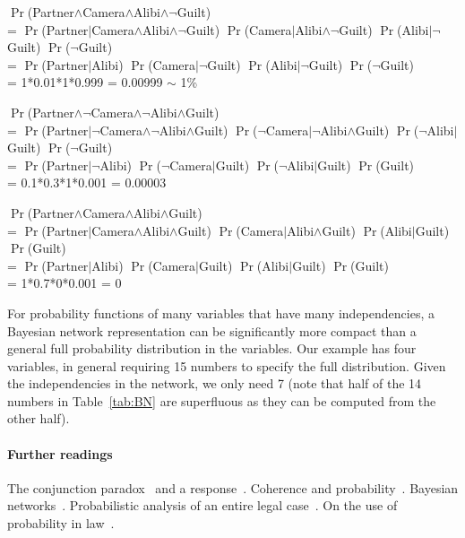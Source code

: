 \documentclass[10pt]{article}
\begin{document}
\begin{description}
	\item $\Pr$(Partner$ \land $Camera$ \land $Alibi$ \land \neg$Guilt)\\
	= $\Pr$(Partner$ | $Camera$ \land $Alibi$ \land \neg$Guilt) $\Pr$(Camera$ | $Alibi$ \land \neg$Guilt) $\Pr$(Alibi$ | \neg$Guilt) $\Pr$($\neg$Guilt)\\
	= $\Pr$(Partner$ | $Alibi) $\Pr$(Camera$ | \neg$Guilt) $\Pr$(Alibi$ | \neg$Guilt) $\Pr$($\neg$Guilt) \\
	= 1*0.01*1*0.999 = 0.00999 $\sim$ 1\%
\end{description}
\begin{description}
	\item $\Pr$(Partner$ \land \neg$Camera$ \land \neg$Alibi$ \land $Guilt)\\
	= $\Pr$(Partner$ | \neg$Camera$ \land \neg$Alibi$ \land $Guilt) $\Pr$($\neg$Camera$ | \neg$Alibi$ \land $Guilt) $\Pr$($\neg$Alibi$ | $Guilt) $\Pr$($\neg$Guilt)\\
	= $\Pr$(Partner$ | \neg$Alibi) $\Pr$($\neg$Camera$ | $Guilt) $\Pr$($\neg$Alibi$ | $Guilt) $\Pr$(Guilt) \\
	= 0.1*0.3*1*0.001 = 0.00003
\end{description}
\begin{description}
	\item $\Pr$(Partner$ \land $Camera$ \land $Alibi$ \land $Guilt)\\
	= $\Pr$(Partner$ | $Camera$ \land $Alibi$ \land $Guilt) $\Pr$(Camera$ | $Alibi$ \land $Guilt) $\Pr$(Alibi$ | $Guilt) $\Pr$(Guilt)\\
	= $\Pr$(Partner$ | $Alibi) $\Pr$(Camera$ | $Guilt) $\Pr$(Alibi$ | $Guilt) $\Pr$(Guilt) \\
	= 1*0.7*0*0.001 = 0
\end{description}

\noindent For probability functions of many variables that have many independencies, a Bayesian network representation can be significantly more compact than a general full probability distribution in the variables. Our example has four variables, in general requiring 15 numbers to specify the full distribution. Given the independencies in the network, we only need 7 (note that half of the 14 numbers in Table~\ref{tab:BN} are superfluous as they can be computed from the other half).  


\paragraph{Further readings}
The conjunction paradox~\citep{cohen1977} and a response~\citep{dawid1987}. 
Coherence and probability~\citep{bovensHartman2003}.
Bayesian networks~\citep{taroniEtal2006}. Probabilistic 
analysis of an entire legal case~\citep{kadaneSchum1996}.
On the use of probability in law~\citep{fenton2011}.
\end{document}
